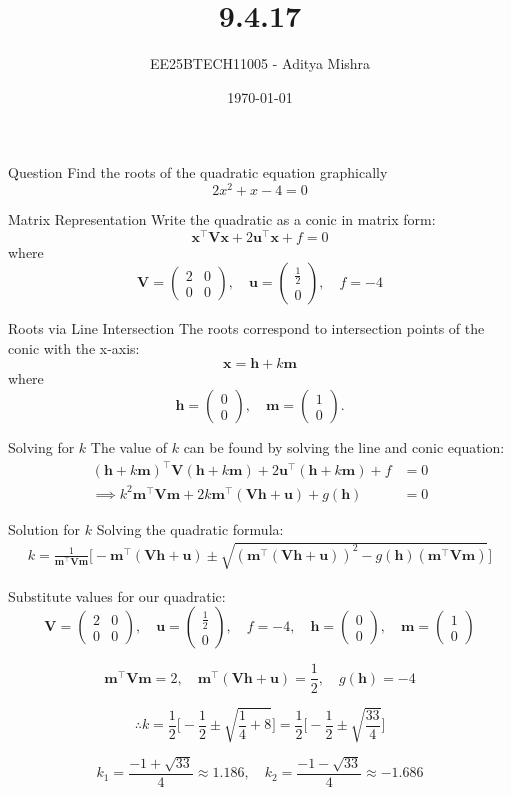 \documentclass{beamer}
\title{9.4.17}
\author{EE25BTECH11005 - Aditya Mishra}
\date{\today}
\newcommand{\myvec}[1]{\begin{pmatrix}#1\end{pmatrix}}
\let\vec\mathbf
\begin{document}
\frame{\titlepage}

\begin{frame}{Question}
Find the roots of the quadratic equation graphically
\[
2x^2 + x - 4 = 0
\]
\end{frame}

\begin{frame}{Matrix Representation}
Write the quadratic as a conic in matrix form:
\[
\vec{x}^{\top} \vec{V} \vec{x} + 2 \vec{u}^{\top} \vec{x} + f = 0
\]
where
\[
\vec{V} = \myvec{2 & 0 \\ 0 & 0}, \quad
\vec{u} = \myvec{\frac{1}{2} \\ 0}, \quad
f = -4
\]
\end{frame}

\begin{frame}{Roots via Line Intersection}
The roots correspond to intersection points of the conic with the x-axis:
\[
\vec{x} = \vec{h} + k \vec{m}
\]
where
\[
\vec{h} = \myvec{0 \\ 0}, \quad \vec{m} = \myvec{1 \\ 0}.
\]
\end{frame}

\begin{frame}{Solving for \(k\)}
The value of $k$ can be found by solving the line and conic equation:
\begin{align}
(\vec{h} + k \vec{m})^{\top} \vec{V} (\vec{h} + k \vec{m}) + 2\vec{u}^{\top} (\vec{h} + k \vec{m}) + f &= 0 \\
\implies k^{2} \vec{m}^{\top}\vec{V}\vec{m} + 2k \vec{m}^{\top} (\vec{V}\vec{h} + \vec{u}) + g(\vec{h}) &= 0
\end{align}
\end{frame}

\begin{frame}{Solution for \(k\)}
Solving the quadratic formula:
\begin{align}
k = \frac{1}{\vec{m}^{\top}\vec{V}\vec{m}}
\Bigg[
    -\vec{m}^{\top} (\vec{V}\vec{h} + \vec{u})
    \pm
    \sqrt{ (\vec{m}^{\top}(\vec{V}\vec{h} + \vec{u}))^2 - g(\vec{h}) (\vec{m}^{\top}\vec{V}\vec{m}) }
\Bigg]
\end{align}

Substitute values for our quadratic:
\[
\vec{V} = \myvec{2 & 0 \\ 0 & 0}, \quad
\vec{u} = \myvec{\frac{1}{2} \\ 0}, \quad
f = -4, \quad
\vec{h} = \myvec{0 \\ 0}, \quad
\vec{m} = \myvec{1 \\ 0}
\]

\[
\vec{m}^{\top} \vec{V} \vec{m} = 2, \quad
\vec{m}^{\top}(\vec{V}\vec{h} + \vec{u}) = \frac{1}{2}, \quad
g(\vec{h}) = -4
\]

\[
\therefore k = \frac{1}{2} \Big[-\frac{1}{2} \pm \sqrt{\frac{1}{4}+8} \Big] = \frac{1}{2} \Big[-\frac{1}{2} \pm \sqrt{\frac{33}{4}} \Big]
\]

\[
k_1 = \frac{-1 + \sqrt{33}}{4} \approx 1.186, \quad
k_2 = \frac{-1 - \sqrt{33}}{4} \approx -1.686
\]
\end{frame}
\end{document}
